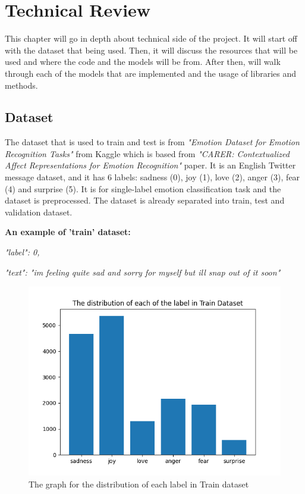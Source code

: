 
\chapter{Technical Review}

This chapter will go in depth about technical side of the project. It will start off with the dataset that being used. Then, it will discuss the resources that will be used and where the code and the models will be from. After then, will walk through each of the models that are implemented and the usage of libraries and methods.

\section{Dataset}
The dataset that is used to train and test is from \textit{"Emotion Dataset for Emotion Recognition Tasks"} \cite{Pandey_2021} from Kaggle which is based from \textit{"CARER: Contextualized Affect Representations for Emotion Recognition"} \cite{saravia-etal-2018-carer} paper. It is an English Twitter message dataset, and it has 6 labels: sadness (0), joy (1), love (2), anger (3), fear (4) and surprise (5). It is for single-label emotion classification task and the dataset is preprocessed. The dataset is already separated into train, test and validation dataset. 

\textbf{An example of 'train' dataset:} 

\emph{"label": 0,}

\textit{"text": "im feeling quite sad and sorry for myself but ill snap out of it soon" }
\begin{figure}[ht]
    \centerline{\includegraphics[scale=0.5]{Figures/dataset_distribution.png}}
    \caption{The graph for the distribution of each label in Train dataset}
    \label{fig:dataset}
\end{figure}

